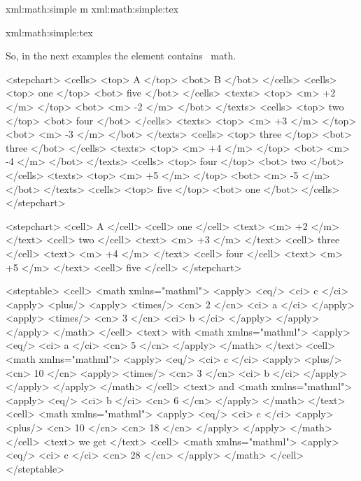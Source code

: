 \startbuffer
\startxmlsetups xml:math:simple
     {m} {xml:math:simple:tex}
\stopxmlsetups

\startxmlsetups xml:math:simple:tex
\stopxmlsetups

\stopbuffer

\typebuffer \getbuffer

So, in the next examples the  element contains \TEX\ math.

\startbuffer
<stepchart>
  <cells> <top> A           </top> <bot> B           </bot> </cells>
  <cells> <top> one         </top> <bot> five        </bot> </cells>
  <texts> <top> <m> +2 </m> </top> <bot> <m> -2 </m> </bot> </texts>
  <cells> <top> two         </top> <bot> four        </bot> </cells>
  <texts> <top> <m> +3 </m> </top> <bot> <m> -3 </m> </bot> </texts>
  <cells> <top> three       </top> <bot> three       </bot> </cells>
  <texts> <top> <m> +4 </m> </top> <bot> <m> -4 </m> </bot> </texts>
  <cells> <top> four        </top> <bot> two         </bot> </cells>
  <texts> <top> <m> +5 </m> </top> <bot> <m> -5 </m> </bot> </texts>
  <cells> <top> five        </top> <bot> one         </bot> </cells>
</stepchart>
\stopbuffer

\typebuffer \processxmlbuffer

\startbuffer
<stepchart>
  <cell> A     </cell>
  <cell> one   </cell> <text> <m> +2 </m> </text>
  <cell> two   </cell> <text> <m> +3 </m> </text>
  <cell> three </cell> <text> <m> +4 </m> </text>
  <cell> four  </cell> <text> <m> +5 </m> </text>
  <cell> five  </cell>
</stepchart>
\stopbuffer

\typebuffer \processxmlbuffer

\startbuffer
<steptable>
  <cell>
    <math xmlns="mathml">
      <apply> <eq/> <ci> c </ci>
        <apply> <plus/>
          <apply> <times/> <cn> 2 </cn> <ci> a </ci> </apply>
          <apply> <times/> <cn> 3 </cn> <ci> b </ci> </apply>
        </apply>
      </apply>
    </math>
  </cell>
  <text> with
    <math xmlns="mathml">
      <apply> <eq/> <ci> a </ci> <cn> 5 </cn> </apply>
    </math>
  </text>
  <cell>
    <math xmlns="mathml">
      <apply> <eq/> <ci> c </ci>
        <apply> <plus/> <cn> 10 </cn>
          <apply> <times/> <cn> 3 </cn> <ci> b </ci> </apply>
        </apply>
      </apply>
    </math>
  </cell>
  <text> and
    <math xmlns="mathml">
      <apply> <eq/> <ci> b </ci> <cn> 6 </cn> </apply>
    </math>
  </text>
  <cell>
    <math xmlns="mathml">
      <apply> <eq/> <ci> c </ci>
        <apply> <plus/> <cn> 10 </cn> <cn> 18 </cn> </apply>
      </apply>
    </math>
  </cell>
  <text>
    we get
  </text>
  <cell>
    <math xmlns="mathml">
      <apply> <eq/> <ci> c </ci> <cn> 28 </cn> </apply>
    </math>
  </cell>
</steptable>
\stopbuffer


